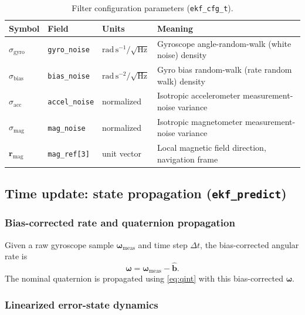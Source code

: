 \documentclass[11pt]{article}
\newcommand{\vect}[1]{\bm{#1}}
\begin{document}
\begin{table}[H]
\centering
\caption{Filter configuration parameters (\texttt{ekf\_cfg\_t}).}
\label{tab:cfg}
\begin{tabular}{@{}llll@{}}
\toprule
Symbol & Field & Units & Meaning \\
\midrule
$\sigma_{\text{gyro}}$ & \texttt{gyro\_noise} & $\mathrm{rad\,s^{-1}/\sqrt{Hz}}$ & Gyroscope angle-random-walk (white noise) density \\
$\sigma_{\text{bias}}$ & \texttt{bias\_noise} & $\mathrm{rad\,s^{-2}/\sqrt{Hz}}$ & Gyro bias random-walk (rate random walk) density \\
$\sigma_{\text{acc}}$ & \texttt{accel\_noise} & normalized & Isotropic accelerometer measurement-noise variance \\
$\sigma_{\text{mag}}$ & \texttt{mag\_noise} & normalized & Isotropic magnetometer measurement-noise variance \\
$\vect r_{\text{mag}}$ & \texttt{mag\_ref[3]} & unit vector & Local magnetic field direction, navigation frame \\
\bottomrule
\end{tabular}
\end{table}

\subsection{Time update: state propagation (\texttt{ekf\_predict})}

\subsubsection{Bias-corrected rate and quaternion propagation}

Given a raw gyroscope sample $\vect\omega_{\text{meas}}$ and time step $\Delta t$, the bias-corrected angular rate is
\begin{equation}
\vect\omega = \vect\omega_{\text{meas}} - \hat{\vect b}.
\end{equation}
The nominal quaternion is propagated using \eqref{eq:qint} with this bias-corrected $\vect\omega$.

\subsubsection{Linearized error-state dynamics}
\end{document}
